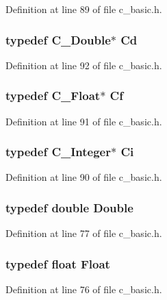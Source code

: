 Definition at line 89 of file c\_\-basic.h.
\subsubsection{\setlength{\rightskip}{0pt plus 5cm}typedef \bf{C\_\-Double}$\ast$ \bf{Cd}}\label{c__basic_8h_211c366dc1e0a6626209185653867ffe}




Definition at line 92 of file c\_\-basic.h.
\subsubsection{\setlength{\rightskip}{0pt plus 5cm}typedef \bf{C\_\-Float}$\ast$ \bf{Cf}}\label{c__basic_8h_2eafa50fdd764d3826fb5643a7f416c2}




Definition at line 91 of file c\_\-basic.h.
\subsubsection{\setlength{\rightskip}{0pt plus 5cm}typedef \bf{C\_\-Integer}$\ast$ \bf{Ci}}\label{c__basic_8h_3775cec4f14beb8c313458e28fb9b530}




Definition at line 90 of file c\_\-basic.h.
\subsubsection{\setlength{\rightskip}{0pt plus 5cm}typedef double \bf{Double}}\label{c__basic_8h_1f2c5f02159fb28428e23074cc04166d}




Definition at line 77 of file c\_\-basic.h.
\subsubsection{\setlength{\rightskip}{0pt plus 5cm}typedef float \bf{Float}}\label{c__basic_8h_07afd7094cb489cbd514c76e6f55d34f}




Definition at line 76 of file c\_\-basic.h.
